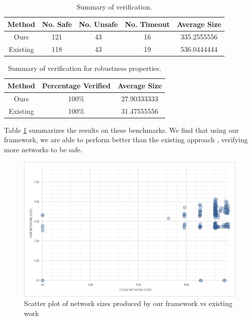 \begin{table}
\begin{tabular}{ |c|c|c|c|c| }
\hline
Method                   & No. Safe    & No. Unsafe & No. Timeout & Average Size \\ 
\hline
Ours                     &   121       & 43         & 16          &  335.2555556\\
Existing \cite{cegar-nn} &   118       & 43         & 19          &  536.0444444\\
\hline                                                                
\end{tabular}
\caption{Summary of \acasxu verification. }
\label{t:acas-verif}
\end{table}

\begin{table}
\begin{tabular}{ |c|c|c| }
\hline
Method                   & Percentage Verified  & Average Size \\ 
\hline
Ours                     &   100\%              &  27.90333333\\
Existing \cite{cegar-nn} &   100\%              &  31.47555556\\
\hline                                                                
\end{tabular}
\caption{Summary of \acasxu verification for robustness properties. }
\label{t:acas-verif-robustness}
\end{table}

Table \ref{t:acas-verif} summarizes the results on these benchmarks. We find that
using our framework, we are able to perform better than the existing \cegar
approach \cite{cegar-nn}, verifying more networks to be safe.

\begin{figure}
    \centering
    \includegraphics[scale=0.25]{figs/scatter-cegar-our-nerualsat.png}
    \caption{Scatter plot of network sizes produced by our framework vs existing
    work \cite{cegar-nn} }
    \label{f:scatter-netsizes}
\end{figure}

